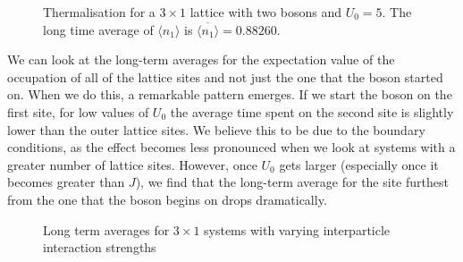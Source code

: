 \documentclass[prb, twocolumn, final]{revtex4-1}
\theoremstyle{plain}
\begin{document}
\begin{figure}[H]
     \caption{Thermalisation for a $3\times 1$ lattice with two bosons and
              $U_{0} = 5$. The long time average of $\langle n_1 \rangle$ is
              $\overline{\langle n_1 \rangle}=0.88260.$}
\end{figure}
We can look at the long-term averages for the expectation value of the
occupation of all of the lattice sites and not just the one that the boson
started on. When we do this, a remarkable pattern emerges. If we start the boson
on the first site, for low values of $U_{0}$ the average time spent on the
second site is slightly lower than the outer lattice sites. We believe this to
be due to the boundary conditions, as the effect becomes less pronounced when we
look at systems with a greater number of lattice sites. However, once $U_{0}$
gets larger (especially once it becomes greater than $J$), we find that the
long-term average for the site furthest from the one that the boson begins on
drops dramatically.
\begin{figure}[H]
     \caption{Long term averages for $3\times1$ systems with varying
              interparticle interaction strengths}
\end{figure}
\end{document}
